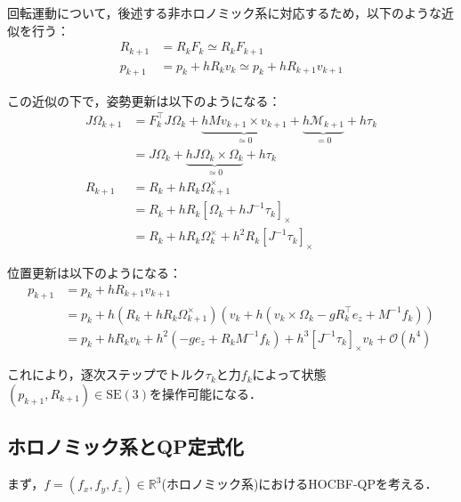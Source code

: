 回転運動について，後述する非ホロノミック系に対応するため，以下のような近似を行う：
\begin{equation}
\begin{aligned}
R_{k+1} &= R_k F_k \simeq R_k F_{k+1} \\
p_{k+1} &= p_k + h R_k v_k \simeq p_k + h R_{k+1} v_{k+1}
\label{eq:approximation}
\end{aligned}
\end{equation}

この近似の下で，姿勢更新は以下のようになる：
\begin{equation}
\begin{aligned}
J \Omega_{k+1} &= F_k^\top J \Omega_k + \underbrace{h M v_{k+1} \times v_{k+1}}_{\simeq 0} + \underbrace{h \mathcal{M}_{k+1}}_{= 0} + h \tau_k \\
&= J \Omega_k + \underbrace{h J \Omega_k \times \Omega_k}_{\simeq 0} + h \tau_k \\
R_{k+1} &= R_k + h R_k \Omega_{k+1}^\times \\
&= R_k + h R_k [\Omega_k + h J^{-1} \tau_k]_\times \\
&= R_k + h R_k \Omega_k^\times + h^2 R_k [J^{-1} \tau_k]_\times
\label{eq:rotation_dynamics}
\end{aligned}
\end{equation}

位置更新は以下のようになる：
\begin{equation}
\begin{aligned}
p_{k+1} &= p_k + h R_{k+1} v_{k+1} \\
&= p_k + h (R_k + h R_k \Omega_{k+1}^\times) (v_k + h (v_k \times \Omega_k - g R_k^\top e_z + M^{-1} f_k)) \\
&= p_k + h R_k v_k + h^2 (-g e_z + R_k M^{-1} f_k) + h^3 [J^{-1} \tau_k]_\times v_k + \mathcal{O}(h^4)
\label{eq:position_dynamics}
\end{aligned}
\end{equation}

これにより，逐次ステップでトルク$\tau_k$と力$f_k$によって状態$(p_{k+1}, R_{k+1}) \in \mathrm{SE}(3)$を操作可能になる．

\subsection{ホロノミック系とQP定式化}

まず，$f = (f_x, f_y, f_z) \in \mathbb{R}^3$(ホロノミック系)におけるHOCBF-QPを考える．

